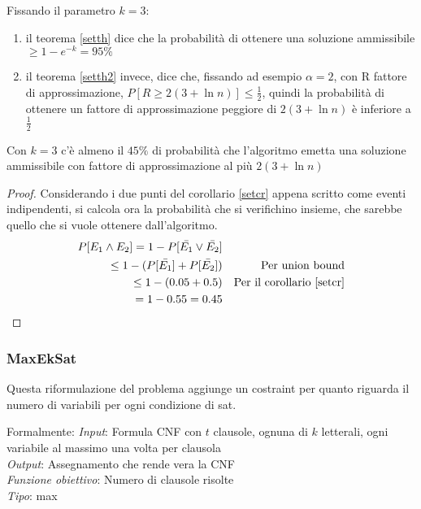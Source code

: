 \begin{corollary}
    \label{setcr}
    Fissando il parametro $k = 3$:
    \begin{enumerate}
        \item il teorema \ref{setth} dice che la probabilità di ottenere una soluzione ammissibile
        $\geq 1-e^{-k} = 95\%$
        \item il teorema \ref{setth2} invece, dice che, fissando ad esempio $\alpha=2$, con R fattore di 
        approssimazione,  $P[R \geq 2(3 + \ln n)] \leq \frac{1}{2}$, quindi la probabilità di ottenere un fattore
        di approssimazione peggiore di $2(3 + \ln n)$ è inferiore a $\frac{1}{2}$
    \end{enumerate}
\end{corollary}

\begin{corollary}
    Con $k = 3$ c'è almeno il $45\%$ di probabilità che l'algoritmo emetta una 
    soluzione ammissibile con fattore di approssimazione al più $2(3+\ln n)$
\end{corollary}
\begin{proof}
    Considerando i due punti del corollario \ref{setcr} appena scritto come eventi indipendenti, 
    si calcola ora la probabilità che si verifichino insieme, che sarebbe quello che si vuole 
    ottenere dall'algoritmo.
    \begin{equation}
        \begin{aligned}
            P[E_1 \wedge E_2] = 1 - P[\bar{E_1} \lor \bar{E_2}]\\
            \leq 1 - (P[\bar{E_1}] + P[\bar{E_2}]) && \text{Per union bound}\\
            \leq 1 - (0.05 + 0.5) && \text{Per il corollario \ref{setcr}}\\
            = 1 - 0.55 = 0.45
        \end{aligned}
    \end{equation}    
\end{proof}

\subsubsection{MaxEkSat}
Questa riformulazione del problema aggiunge un costraint per quanto riguarda il numero di 
variabili per ogni condizione di sat.

Formalmente:
\emph{Input}: Formula CNF con $t$ clausole, ognuna di $k$ letterali, ogni variabile al massimo una volta
per clausola\\
\emph{Output}: Assegnamento che rende vera la CNF\\
\emph{Funzione obiettivo}: Numero di clausole risolte\\
\emph{Tipo}: max

